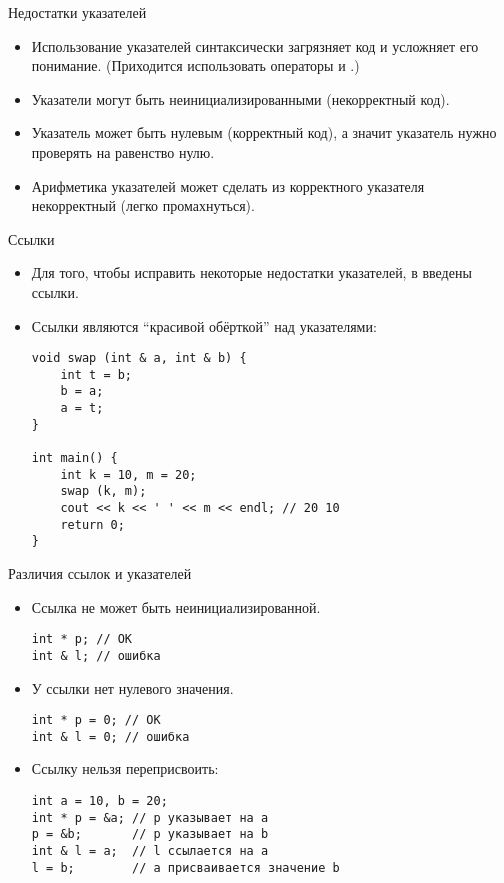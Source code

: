 \documentclass{beamer}
\begin{document}
\begin{frame}[fragile]{Недостатки указателей}
    \begin{itemize}
        \item Использование указателей синтаксически загрязняет код
            и усложняет его понимание.
            (Приходится использовать операторы \code{*} и \code{\&}.)

        \item Указатели могут быть неинициализированными (некорректный код).

        \item Указатель может быть нулевым (корректный код), 
            а значит указатель нужно проверять на равенство нулю.

        \item Арифметика указателей может сделать из корректного указателя
            некорректный (легко промахнуться).
    \end{itemize}
\end{frame}

\begin{frame}[fragile]{Ссылки}
    \begin{itemize}
        \item Для того, чтобы исправить некоторые недостатки указателей,
            в \langcpp введены ссылки.

        \item Ссылки являются ``красивой обёрткой'' над указателями:
\begin{lstlisting}
void swap (int & a, int & b) {
    int t = b;
    b = a;
    a = t;
}

int main() {
    int k = 10, m = 20;
    swap (k, m);
    cout << k << ' ' << m << endl; // 20 10
    return 0;
}
\end{lstlisting}
    \end{itemize}
\end{frame}

\begin{frame}[fragile]{Различия ссылок и указателей}
    \begin{itemize}
        \item Ссылка не может быть неинициализированной.
\begin{lstlisting}
int * p; // OK
int & l; // ошибка
\end{lstlisting}

        \item У ссылки нет нулевого значения.            
\begin{lstlisting}
int * p = 0; // OK
int & l = 0; // ошибка
\end{lstlisting}
            
    \item Ссылку нельзя переприсвоить:
\begin{lstlisting}
int a = 10, b = 20;
int * p = &a; // p указывает на a
p = &b;       // p указывает на b
int & l = a;  // l ссылается на a
l = b;        // a присваивается значение b
\end{lstlisting}
\end{itemize}
\end{frame}
\end{document}
